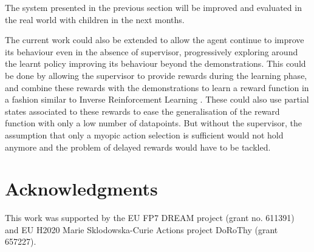\documentclass[letterpaper]{article} %
\begin{document}
The system presented in the previous section will be improved and
evaluated in the real world with children in the next months.

The current work could also be extended to allow the agent continue to improve its
behaviour even in the absence of supervisor, progressively exploring around the
learnt policy improving its behaviour beyond the demonstrations. This
could be done by allowing the supervisor to provide rewards during the learning
phase, and combine these rewards with the demonstrations to learn a reward
function in a fashion similar to Inverse Reinforcement Learning
\cite{abbeel2004apprenticeship}. These could also use partial states associated
to these rewards to ease the generalisation of the reward function with only a
low number of datapoints.
But without the supervisor, the assumption that only a
myopic action selection is sufficient would not hold anymore and the problem of
delayed rewards would have to be tackled.
\label{sec:conclusion}
\section{Acknowledgments}
This work was supported by the EU FP7 DREAM project (grant no.  611391) and EU
H2020 Marie Sklodowska-Curie Actions project DoRoThy (grant 657227).  

 
\end{document}

